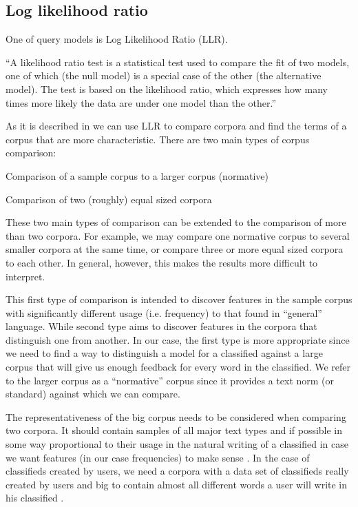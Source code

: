 \subsection{Log likelihood ratio}

One of query models is Log Likelihood Ratio (LLR).

``A likelihood ratio test is a statistical test used to compare the fit of two models, one of which (the null model) is a special case of the other (the alternative model). The test is based on the likelihood ratio, which expresses how many times more likely the data are under one model than the other.''

As it is described in \cite{RaysonGarside} we can use LLR to compare corpora and find the terms of a corpus that are more characteristic. There are two main types of corpus comparison:

\begin{list}{.}{}
\item Comparison of a sample corpus to a larger corpus (normative)
\item Comparison of two (roughly) equal sized corpora
\end{list}

These two main types of comparison can be extended to the comparison of more than two corpora. For example, we may compare one normative corpus to several smaller corpora at the same time, or compare three or more equal sized corpora to each other. In general, however, this makes the results more difficult to interpret.

This first type of comparison is intended to discover features in the sample corpus with significantly different usage (i.e. frequency) to that found in ``general'' language. While second type aims to discover features in the corpora that distinguish one from another. In our case, the first type is more appropriate since we need to find a way to distinguish a model for a classified against a large corpus that will give us enough feedback for every word in the classified. We refer to the larger corpus as a ``normative'' corpus since it provides a text norm (or standard) against which we can compare.

The representativeness of the big corpus needs to be considered when comparing two corpora. It should contain samples of all major text types and if possible in some way proportional to their usage in the natural writing of a classified in case we want features (in our case frequencies) to make sense . In the case of classifieds created by users, we need a corpora with a data set of classifieds really created by users and big to contain almost all different words a user will write in his classified \cite{RaysonGarside}.

